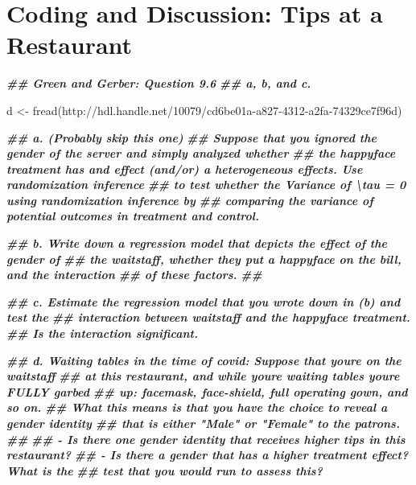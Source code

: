 \documentclass[
]{book}
\newenvironment{Shaded}{\begin{snugshade}}{\end{snugshade}}
\newcommand{\DocumentationTok}[1]{\textcolor[rgb]{0.56,0.35,0.01}{\textbf{\textit{#1}}}}
\newcommand{\FunctionTok}[1]{\textcolor[rgb]{0.00,0.00,0.00}{#1}}
\newcommand{\NormalTok}[1]{#1}
\newcommand{\OtherTok}[1]{\textcolor[rgb]{0.56,0.35,0.01}{#1}}
\newcommand{\StringTok}[1]{\textcolor[rgb]{0.31,0.60,0.02}{#1}}
\begin{document}
\hypertarget{coding-and-discussion-tips-at-a-restaurant}{%
\section{Coding and Discussion: Tips at a
Restaurant}\label{coding-and-discussion-tips-at-a-restaurant}}

\begin{Shaded}
\begin{Highlighting}[]
\DocumentationTok{\#\# Green and Gerber: Question 9.6}
\DocumentationTok{\#\# a, b, and c. }

\NormalTok{d }\OtherTok{\textless{}{-}} \FunctionTok{fread}\NormalTok{(}\StringTok{\textquotesingle{}http://hdl.handle.net/10079/cd6be01a{-}a827{-}4312{-}a2fa{-}74329ce7f96d\textquotesingle{}}\NormalTok{)}

\DocumentationTok{\#\# a. (Probably skip this one)}
\DocumentationTok{\#\#    Suppose that you ignored the gender of the server and simply analyzed whether}
\DocumentationTok{\#\#    the happyface treatment has and effect (and/or) a heterogeneous effects. Use randomization inference }
\DocumentationTok{\#\#    to test whether the Variance of \textbackslash{}tau = 0 using randomization inference by }
\DocumentationTok{\#\#    comparing the variance of potential outcomes in treatment and control. }

\DocumentationTok{\#\# b. Write down a regression model that depicts the effect of the gender of }
\DocumentationTok{\#\#    the waitstaff, whether they put a happyface on the bill, and the interaction }
\DocumentationTok{\#\#    of these factors. }
\DocumentationTok{\#\# }

\DocumentationTok{\#\# c. Estimate the regression model that you wrote down in (b) and test the }
\DocumentationTok{\#\#    interaction between waitstaff and the happyface treatment. }
\DocumentationTok{\#\#    Is the interaction significant. }

\DocumentationTok{\#\# d. Waiting tables in the time of covid: Suppose that you\textquotesingle{}re on the waitstaff }
\DocumentationTok{\#\#    at this restaurant, and while you\textquotesingle{}re waiting tables you\textquotesingle{}re FULLY garbed }
\DocumentationTok{\#\#    up: facemask, face{-}shield, full operating gown, and so on. }
\DocumentationTok{\#\#    What this means is that you have the choice to reveal a gender identity}
\DocumentationTok{\#\#    that is either "Male" or "Female" to the patrons. }
\DocumentationTok{\#\# }
\DocumentationTok{\#\#    {-} Is there one gender identity that receives higher tips in this restaurant? }
\DocumentationTok{\#\#    {-} Is there a gender that has a higher treatment effect? What is the }
\DocumentationTok{\#\#      test that you would run to assess this? }
\end{Highlighting}
\end{Shaded}
\end{document}
